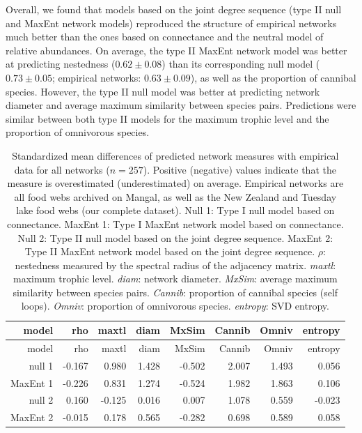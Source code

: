 \documentclass[11pt]{article}
\begin{document}
Overall, we found that models based on the joint degree sequence (type
II null and MaxEnt network models) reproduced the structure of empirical
networks much better than the ones based on connectance and the neutral
model of relative abundances. On average, the type II MaxEnt network
model was better at predicting nestedness (\(0.62 \pm 0.08\)) than its
corresponding null model (\(0.73 \pm 0.05\); empirical networks:
\(0.63 \pm 0.09\)), as well as the proportion of cannibal species.
However, the type II null model was better at predicting network
diameter and average maximum similarity between species pairs.
Predictions were similar between both type II models for the maximum
trophic level and the proportion of omnivorous species.

\hypertarget{tbl:measures_all}{}
\begin{longtable}[]{@{}rrrrrrrr@{}}
\caption{\label{tbl:measures_all}Standardized mean differences of
predicted network measures with empirical data for all networks
(\(n = 257\)). Positive (negative) values indicate that the measure is
overestimated (underestimated) on average. Empirical networks are all
food webs archived on Mangal, as well as the New Zealand and Tuesday
lake food webs (our complete dataset). Null 1: Type I null model based
on connectance. MaxEnt 1: Type I MaxEnt network model based on
connectance. Null 2: Type II null model based on the joint degree
sequence. MaxEnt 2: Type II MaxEnt network model based on the joint
degree sequence. \(\rho\): nestedness measured by the spectral radius of
the adjacency matrix. \emph{maxtl}: maximum trophic level. \emph{diam}:
network diameter. \emph{MxSim}: average maximum similarity between
species pairs. \emph{Cannib}: proportion of cannibal species (self
loops). \emph{Omniv}: proportion of omnivorous species. \emph{entropy}:
SVD entropy.}\tabularnewline
\toprule
model & rho & maxtl & diam & MxSim & Cannib & Omniv &
entropy\tabularnewline
\midrule
\endfirsthead
\toprule
model & rho & maxtl & diam & MxSim & Cannib & Omniv &
entropy\tabularnewline
\midrule
\endhead
null 1 & -0.167 & 0.980 & 1.428 & -0.502 & 2.007 & 1.493 &
0.056\tabularnewline
MaxEnt 1 & -0.226 & 0.831 & 1.274 & -0.524 & 1.982 & 1.863 &
0.106\tabularnewline
null 2 & 0.160 & -0.125 & 0.016 & 0.007 & 1.078 & 0.559 &
-0.023\tabularnewline
MaxEnt 2 & -0.015 & 0.178 & 0.565 & -0.282 & 0.698 & 0.589 &
0.058\tabularnewline
\bottomrule
\end{longtable}
\end{document}
